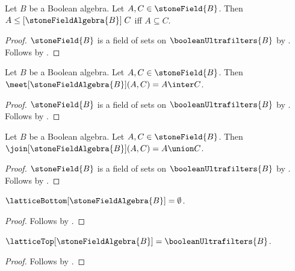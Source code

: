 \begin{proposition}\label{stone_field_algebra_order_iff}
    Let $B$ be a Boolean algebra.
    Let $A,C\in\stoneField{B}$.
    Then $A\mathrel{\leq[\stoneFieldAlgebra{B}]}C$ iff
        $A\subseteq C$.
\end{proposition}
\begin{proof}
    $\stoneField{B}$ is a field of sets on
        $\booleanUltrafilters{B}$ by
        .
    Follows by
        .
\end{proof}

\begin{proposition}\label{stone_field_algebra_meet_apply}
    Let $B$ be a Boolean algebra.
    Let $A,C\in\stoneField{B}$.
    Then $\meet[\stoneFieldAlgebra{B}](A,C)=A\inter C$.
\end{proposition}
\begin{proof}
    $\stoneField{B}$ is a field of sets on
        $\booleanUltrafilters{B}$ by
        .
    Follows by
        .
\end{proof}

\begin{proposition}\label{stone_field_algebra_join_apply}
    Let $B$ be a Boolean algebra.
    Let $A,C\in\stoneField{B}$.
    Then $\join[\stoneFieldAlgebra{B}](A,C)=A\union C$.
\end{proposition}
\begin{proof}
    $\stoneField{B}$ is a field of sets on
        $\booleanUltrafilters{B}$ by
        .
    Follows by
        .
\end{proof}

\begin{proposition}\label{stone_field_algebra_bottom}
    $\latticeBottom[\stoneFieldAlgebra{B}]=\emptyset$.
\end{proposition}
\begin{proof}
    Follows by
        .
\end{proof}

\begin{proposition}\label{stone_field_algebra_top}
    $\latticeTop[\stoneFieldAlgebra{B}]=\booleanUltrafilters{B}$.
\end{proposition}
\begin{proof}
    Follows by
        .
\end{proof}


